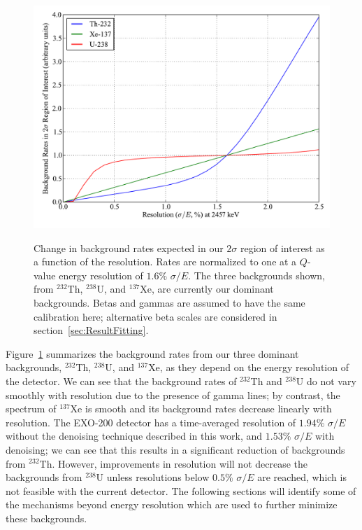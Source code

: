 \begin{figure}
\begin{center}
\includegraphics[keepaspectratio=true,width=\textwidth]{scripts/BackgroundsVsRes.pdf}
\end{center}
\renewcommand{\baselinestretch}{1}
\small\normalsize
\begin{quote}
\caption{Change in background rates expected in our $2\sigma$ region of interest as a function of the resolution.  Rates are normalized to one at a $Q$-value energy resolution of $1.6\%$ $\sigma/E$.  The three backgrounds shown, from $^{232}$Th, $^{238}$U, and $^{137}$Xe, are currently our dominant backgrounds.  Betas and gammas are assumed to have the same calibration here; alternative beta scales are considered in section~\ref{sec:ResultFitting}.}
\label{fig:BackgroundVsResolution}
\end{quote}
\end{figure}
\renewcommand{\baselinestretch}{2}
\small\normalsize

Figure~\ref{fig:BackgroundVsResolution} summarizes the background rates from our three dominant backgrounds, $^{232}$Th, $^{238}$U, and $^{137}$Xe, as they depend on the energy resolution of the detector.  We can see that the background rates of $^{232}$Th and $^{238}$U do not vary smoothly with resolution due to the presence of gamma lines; by contrast, the spectrum of $^{137}$Xe is smooth and its background rates decrease linearly with resolution.  The EXO-200 detector has a time-averaged resolution of $1.94\%$ $\sigma/E$ without the denoising technique described in this work, and $1.53\%$ $\sigma/E$ with denoising; we can see that this results in a significant reduction of backgrounds from $^{232}$Th.  However, improvements in resolution will not decrease the backgrounds from $^{238}$U unless resolutions below $0.5\%$ $\sigma/E$ are reached, which is not feasible with the current detector.  The following sections will identify some of the mechanisms beyond energy resolution which are used to further minimize these backgrounds.

